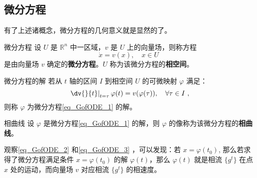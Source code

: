 \subsection{微分方程}
有了上述诸概念，微分方程的几何意义就是显然的了。
\begin{definition}{微分方程}\label{def_GofODE_7}
设 $U$ 是 $\mathbb R^n$ 中一区域，$v$ 是 $U$ 上的向量场，则称方程
\begin{equation}\label{eq_GofODE_1}
\dot x=v(x),\quad x\in U~
\end{equation}
是由向量场 $v$ 确定的\textbf{微分方程}。$U$ 称为该微分方程的\textbf{相空间}。 
\end{definition}

\begin{definition}{微分方程的解}
若从 $t$ 轴的区间 $I$ 到相空间 $U$ 的可微映射 $\varphi$ 满足：
\begin{equation}\label{eq_GofODE_3}
\left.\dv{}{t}\right|_{t=\tau}\varphi(t)=v(\varphi(\tau)),\quad\forall\tau\in I~,
\end{equation}
则称 $\varphi$ 为微分方程\autoref{eq_GofODE_1} 的解。
\end{definition}
\begin{definition}{相曲线}
设 $\varphi$ 是微分方程\autoref{eq_GofODE_1} 的解，则 $\varphi$ 的像称为该微分方程的\textbf{相曲线}。
\end{definition}
观察\autoref{eq_GofODE_2} 和\autoref{eq_GofODE_3} ，可以发现：若 $x=\varphi(t_0)$, 那么若求得了微分方程满足条件 $x=\varphi(t_0)$ 的解 $\varphi(t)$，那么 $\varphi(t)$ 就是相流 $\{g^t\}$ 在点 $x$ 处的运动，而向量场 $v$ 对应相流 $\{g^t\}$ 的相速度。
